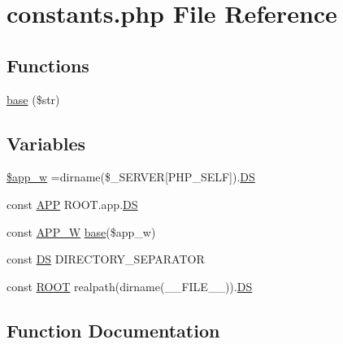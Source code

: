 \hypertarget{constants_8php}{}\section{constants.\+php File Reference}
\label{constants_8php}
\subsection*{Functions}
\begin{DoxyCompactItemize}
\item 
\hyperlink{constants_8php_a09763541667d8e51df70865805cc29ee}{base} (\$str)
\end{DoxyCompactItemize}
\subsection*{Variables}
\begin{DoxyCompactItemize}
\item 
\hyperlink{constants_8php_aba44f7d2f4078b9cb6bb51dcc121f414}{\$app\+\_\+w} =dirname(\$\+\_\+\+S\+E\+R\+V\+E\+R\mbox{[}\textquotesingle{}P\+H\+P\+\_\+\+S\+E\+L\+F\textquotesingle{}\mbox{]}).\hyperlink{constants_8php_ae073998f73900b8375397889044c8313}{D\+S}
\item 
const \hyperlink{constants_8php_a0209851fb6790e1be57a9edf2107c091}{A\+P\+P} R\+O\+O\+T.\textquotesingle{}app\textquotesingle{}.\hyperlink{constants_8php_ae073998f73900b8375397889044c8313}{D\+S}
\item 
const \hyperlink{constants_8php_a1c000d3159a0f3eefd9732412d15a402}{A\+P\+P\+\_\+\+W} \hyperlink{constants_8php_a09763541667d8e51df70865805cc29ee}{base}(\$app\+\_\+w)
\item 
const \hyperlink{constants_8php_ae073998f73900b8375397889044c8313}{D\+S} D\+I\+R\+E\+C\+T\+O\+R\+Y\+\_\+\+S\+E\+P\+A\+R\+A\+T\+O\+R
\item 
const \hyperlink{constants_8php_a18c0644836e196aed6d63779e14d6bd8}{R\+O\+O\+T} realpath(dirname(\+\_\+\+\_\+\+F\+I\+L\+E\+\_\+\+\_\+)).\hyperlink{constants_8php_ae073998f73900b8375397889044c8313}{D\+S}
\end{DoxyCompactItemize}


\subsection{Function Documentation}
\hypertarget{constants_8php_a09763541667d8e51df70865805cc29ee}{}
